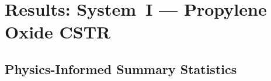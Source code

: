 \documentclass[aps,pre,twocolumn,superscriptaddress]{revtex4-2}
\begin{document}
%

\section{Results: System~I --- Propylene Oxide CSTR}
\label{sec:results_system1}

\subsection{Physics-Informed Summary Statistics}
\label{sec:summary_stats}
\end{document}

